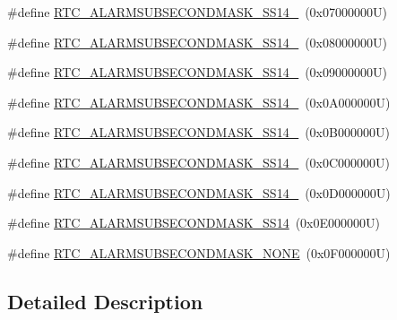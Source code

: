 \begin{DoxyCompactItemize}
\#define \hyperlink{group___r_t_c___alarm___sub___seconds___masks___definitions_gac0f57cb99c0a40708e3dd44eafa7f8e6}{R\+T\+C\+\_\+\+A\+L\+A\+R\+M\+S\+U\+B\+S\+E\+C\+O\+N\+D\+M\+A\+S\+K\+\_\+\+S\+S14\+\_}~(0x07000000\+U)
\item 
\#define \hyperlink{group___r_t_c___alarm___sub___seconds___masks___definitions_ga0f7cdfed3ad8bbe33fc2c4c2b8d5d2ce}{R\+T\+C\+\_\+\+A\+L\+A\+R\+M\+S\+U\+B\+S\+E\+C\+O\+N\+D\+M\+A\+S\+K\+\_\+\+S\+S14\+\_}~(0x08000000\+U)
\item 
\#define \hyperlink{group___r_t_c___alarm___sub___seconds___masks___definitions_ga173d153f6543cd34062d8ca14fb04975}{R\+T\+C\+\_\+\+A\+L\+A\+R\+M\+S\+U\+B\+S\+E\+C\+O\+N\+D\+M\+A\+S\+K\+\_\+\+S\+S14\+\_}~(0x09000000\+U)
\item 
\#define \hyperlink{group___r_t_c___alarm___sub___seconds___masks___definitions_ga7cb4d4abdac134b508cbb6e9b5d21638}{R\+T\+C\+\_\+\+A\+L\+A\+R\+M\+S\+U\+B\+S\+E\+C\+O\+N\+D\+M\+A\+S\+K\+\_\+\+S\+S14\+\_}~(0x0\+A000000\+U)
\item 
\#define \hyperlink{group___r_t_c___alarm___sub___seconds___masks___definitions_gaf67fcaa5c58e46e47d97be746c9dec24}{R\+T\+C\+\_\+\+A\+L\+A\+R\+M\+S\+U\+B\+S\+E\+C\+O\+N\+D\+M\+A\+S\+K\+\_\+\+S\+S14\+\_}~(0x0\+B000000\+U)
\item 
\#define \hyperlink{group___r_t_c___alarm___sub___seconds___masks___definitions_ga37c03d1ef098287fa559af1a28bd8ba5}{R\+T\+C\+\_\+\+A\+L\+A\+R\+M\+S\+U\+B\+S\+E\+C\+O\+N\+D\+M\+A\+S\+K\+\_\+\+S\+S14\+\_}~(0x0\+C000000\+U)
\item 
\#define \hyperlink{group___r_t_c___alarm___sub___seconds___masks___definitions_gada3b5b45dbdabf604340b0c09bdbdc2c}{R\+T\+C\+\_\+\+A\+L\+A\+R\+M\+S\+U\+B\+S\+E\+C\+O\+N\+D\+M\+A\+S\+K\+\_\+\+S\+S14\+\_}~(0x0\+D000000\+U)
\item 
\#define \hyperlink{group___r_t_c___alarm___sub___seconds___masks___definitions_ga91e1225dc11de4ce4bd74eb18fc155f7}{R\+T\+C\+\_\+\+A\+L\+A\+R\+M\+S\+U\+B\+S\+E\+C\+O\+N\+D\+M\+A\+S\+K\+\_\+\+S\+S14}~(0x0\+E000000\+U)
\item 
\#define \hyperlink{group___r_t_c___alarm___sub___seconds___masks___definitions_ga2c3802d48626766a3fc85ad910caea02}{R\+T\+C\+\_\+\+A\+L\+A\+R\+M\+S\+U\+B\+S\+E\+C\+O\+N\+D\+M\+A\+S\+K\+\_\+\+N\+O\+NE}~(0x0\+F000000\+U)
\end{DoxyCompactItemize}


\subsection{Detailed Description}


